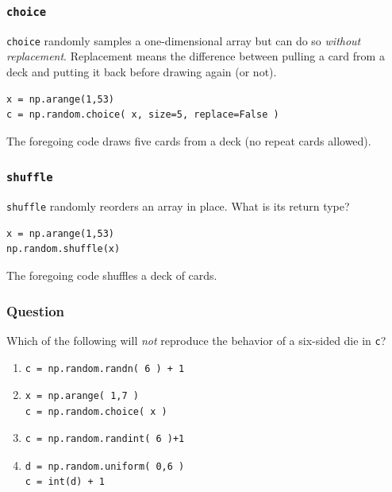 \documentclass[11pt]{beamer}
\begin{document}
\begin{frame}[fragile]
  \frametitle{\texttt{choice}}
  \Enlarge

  \begin{enumerate}
  \myitem  \texttt{choice} randomly samples a one-dimensional array but can do so \emph{without replacement}. %
  \myitem  Replacement means the difference between pulling a card from a deck and putting it back before drawing again (or not). %
  \end{enumerate}
  \begin{Verbatim}
x = np.arange(1,53)
c = np.random.choice( x, size=5, replace=False )
  \end{Verbatim}
  \begin{enumerate}
  \myitem  The foregoing code draws five cards from a deck (no repeat cards allowed).
  \end{enumerate}
\end{frame}

\begin{frame}[fragile]
  \frametitle{\texttt{shuffle}}
  \Enlarge

  \begin{enumerate}
  \myitem  \texttt{shuffle} randomly reorders an array in place.
  \myitem  What is its return type? %
  \end{enumerate}
  \begin{Verbatim}
x = np.arange(1,53)
np.random.shuffle(x)
  \end{Verbatim}
  \begin{enumerate}
  \myitem  The foregoing code shuffles a deck of cards.
  \end{enumerate}
\end{frame}

\begin{frame}[fragile]
  \frametitle{Question}
  \Enlarge

  Which of the following will \emph{not} reproduce the behavior of a six-sided die in \texttt{c}?

  \begin{enumerate}[label=\Alph*]
  \item
  \begin{Verbatim}
c = np.random.randn( 6 ) + 1
  \end{Verbatim}
  \item
  \begin{Verbatim}
x = np.arange( 1,7 )
c = np.random.choice( x )
  \end{Verbatim}
  \item
  \begin{Verbatim}
c = np.random.randint( 6 )+1
  \end{Verbatim}
  \item
  \begin{Verbatim}
d = np.random.uniform( 0,6 )
c = int(d) + 1
  \end{Verbatim}
  \end{enumerate}
\end{frame}
\end{document}
